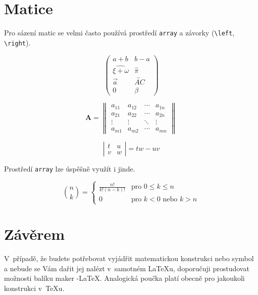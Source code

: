 \documentclass[a4paper, twocolumn, 11pt]{article}
\theoremstyle{definition}
\theoremstyle{plain}
\theoremstyle{plain}
\begin{document}
\section{Matice}

Pro sázení matic se velmi často používá prostředí \verb|array| a závorky (\verb|\left|, \verb|\right|).

$$ \left(
\begin{array}{cc}
a + b & b - a \\
\widehat{\xi + \omega} & \hat{\pi} \\
\vec{a} & \overleftrightarrow{AC} \\
0 & \beta
\end{array}
\right) $$

$$ \mathbf{A} = \left\|
\begin{array}{cccc}
a_{11} & a_{12} & \cdots & a_{1n}\\
a_{21} & a_{22} & \cdots & a_{2n}\\
\vdots & \vdots & \ddots & \vdots\\
a_{m1} & a_{m2} & \cdots & a_{mn}
\end{array}
\right\| $$

$$ \left|
\begin{array}{cc}
t & u\\
v & w
\end{array}
\right| = tw - uv
$$

Prostředí \verb|array| lze úspěšně využít i jinde.

$$
\binom{n}{k} = \left\{
\begin{array}{ll}
\frac{n!}{k!(n-k)!} & \mbox{pro } 0 \leq k \leq n \\
0 & \mbox{pro } k < 0 \mbox{ nebo } k > n
\end{array}
\right. $$

\section{Závěrem}

V~případě, že budete potřebovat vyjádřit matematickou konstrukci nebo symbol a nebude se Vám dařit jej nalézt v~samotném \LaTeX u, doporučuji prostudovat možnosti balíku maker \AmS -\LaTeX.
Analogická poučka platí obecně pro jakoukoli konstrukci v~\TeX u.
\end{document}
